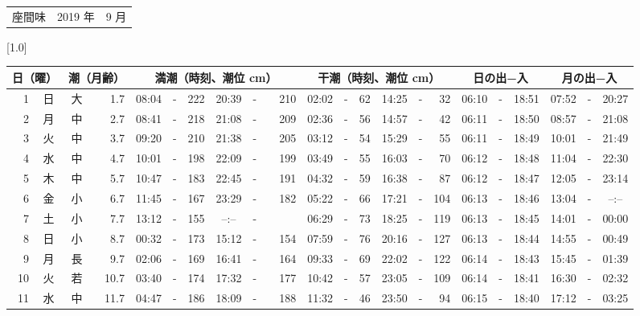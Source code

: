 \documentclass[12pt,a4j]{jsarticle}
\begin{document}
 \begin{table}[htbp]
 \begin{center}
 \begin{tabular}{lcc}
 \LARGE{座間味}  & \large{2019 年} & \large{ 9 月} \\
 \end{tabular}
 \end{center}
 \begin{center}
    \scalebox{0.7}[1.0]{
    \begin{tabular}{|rc|cr|ccrccr|ccrccr|ccc|ccc|}
    \hline
    \multicolumn{2}{|c|}{日（曜）} & \multicolumn{2}{c|}{潮（月齢）} & \multicolumn{6}{c|}{満潮（時刻、潮位 cm）} & \multicolumn{6}{c|}{干潮（時刻、潮位 cm）} & \multicolumn{3}{c|}{日の出−入} &  \multicolumn{3}{c|}{月の出−入}\\
 \hline
 1 & 日 & 大 &  1.7 &  08:04 &-& 222 &  20:39 &-& 210 &  02:02 &-&  62 &  14:25 &-&  32 & 06:10 & -& 18:51 & 07:52 & -& 20:27 \\
 2 & 月 & 中 &  2.7 &  08:41 &-& 218 &  21:08 &-& 209 &  02:36 &-&  56 &  14:57 &-&  42 & 06:11 & -& 18:50 & 08:57 & -& 21:08 \\
 3 & 火 & 中 &  3.7 &  09:20 &-& 210 &  21:38 &-& 205 &  03:12 &-&  54 &  15:29 &-&  55 & 06:11 & -& 18:49 & 10:01 & -& 21:49 \\
 4 & 水 & 中 &  4.7 &  10:01 &-& 198 &  22:09 &-& 199 &  03:49 &-&  55 &  16:03 &-&  70 & 06:12 & -& 18:48 & 11:04 & -& 22:30 \\
 5 & 木 & 中 &  5.7 &  10:47 &-& 183 &  22:45 &-& 191 &  04:32 &-&  59 &  16:38 &-&  87 & 06:12 & -& 18:47 & 12:05 & -& 23:14 \\
 6 & 金 & 小 &  6.7 &  11:45 &-& 167 &  23:29 &-& 182 &  05:22 &-&  66 &  17:21 &-& 104 & 06:13 & -& 18:46 & 13:04 & -& --:-- \\
 7 & 土 & 小 &  7.7 &  13:12 &-& 155 &  --:-- &-&~~~~~ &  06:29 &-&  73 &  18:25 &-& 119 & 06:13 & -& 18:45 & 14:01 & -& 00:00 \\
 8 & 日 & 小 &  8.7 &  00:32 &-& 173 &  15:12 &-& 154 &  07:59 &-&  76 &  20:16 &-& 127 & 06:13 & -& 18:44 & 14:55 & -& 00:49 \\
 9 & 月 & 長 &  9.7 &  02:06 &-& 169 &  16:41 &-& 164 &  09:33 &-&  69 &  22:02 &-& 122 & 06:14 & -& 18:43 & 15:45 & -& 01:39 \\
10 & 火 & 若 & 10.7 &  03:40 &-& 174 &  17:32 &-& 177 &  10:42 &-&  57 &  23:05 &-& 109 & 06:14 & -& 18:41 & 16:30 & -& 02:32 \\
11 & 水 & 中 & 11.7 &  04:47 &-& 186 &  18:09 &-& 188 &  11:32 &-&  46 &  23:50 &-&  94 & 06:15 & -& 18:40 & 17:12 & -& 03:25 \\

\end{tabular}}
\end{center}
\end{table}
\end{document}
